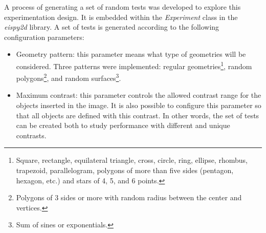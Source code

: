				A process of generating a set of random tests was developed to explore this experimentation design. It is embedded within the \textit{Experiment} class in the \textit{eispy2d} library. A set of tests is generated according to the following configuration parameters:
				\begin{itemize}
					\item Geometry pattern: this parameter means what type of geometries will be considered. Three patterns were implemented: regular geometries\footnote{Square, rectangle, equilateral triangle, cross, circle, ring, ellipse, rhombus, trapezoid, parallelogram, polygons of more than five sides (pentagon, hexagon, etc.) and stars of 4, 5, and 6 points.}, random polygons\footnote{Polygons of 3 sides or more with random radius between the center and vertices.}, and random surfaces\footnote{Sum of sines or exponentials.}.
					\item Maximum contrast: this parameter controls the allowed contrast range for the objects inserted in the image. It is also possible to configure this parameter so that all objects are defined with this contrast. In other words, the set of tests can be created both to study performance with different and unique contrasts.

\end{itemize}
